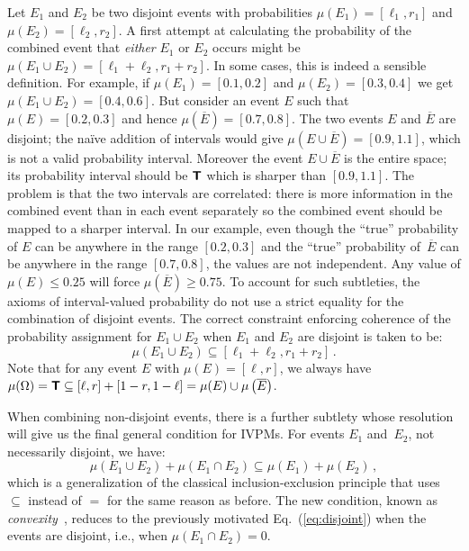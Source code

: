 \documentclass[english,reprint, aps, prl,superscriptaddress, showpacs,
showkeys, longbibliography, amsmath, amssymb, floatfix]{revtex4-1}
\theoremstyle{plain}
\theoremstyle{definition}
\newcommand{\interval}[1]{{\normalfont\textsf{\textbf{#1}}}}
\newcommand{\necess}{\interval{T}}
\begin{document}
Let $E_1$ and $E_2$ be two disjoint events with probabilities
$\mu(E_1)=[\ell_1,r_1]$ and $\mu(E_2)=[\ell_2,r_2]$. A first attempt
at calculating the probability of the combined event that
\emph{either} $E_1$ or $E_2$ occurs might be
$\mu(E_1\cup E_2) = [\ell_1+\ell_2,r_1+r_2]$. In some cases, this is
indeed a sensible definition. For example, if $\mu(E_1)=[0.1,0.2]$ and
$\mu(E_2)=[0.3,0.4]$ we get $\mu(E_1\cup E_2) = [0.4,0.6]$. But
consider an event $E$ such that $\mu(E)=[0.2,0.3]$ and hence
$\mu\left(\overline{E}\right)=[0.7,0.8]$. The two events $E$ and $\overline{E}$
are disjoint; the naïve addition of intervals would give
$\mu\left(E\cup\overline{E}\right)=[0.9,1.1]$, which is not a valid probability
interval. Moreover the event $E\cup\overline{E}$ is the
entire space; its probability interval should be
$\necess$ which is sharper than $[0.9,1.1]$. The problem is that the
two intervals are correlated: there is more information in the
combined event than in each event separately so the combined event should be mapped to
a sharper interval. In our example, even
though the ``true'' probability of $E$ can be anywhere in the range
$[0.2,0.3]$ and the ``true'' probability of~$\overline{E}$ can be
anywhere in the range $[0.7,0.8]$, the values are not independent. Any
value of $\mu(E) \leq 0.25$ will force $\mu\left(\overline{E}\right)\geq
0.75$. To account for such subtleties, the axioms of interval-valued
probability do not use a strict equality for the combination of
disjoint events. The correct constraint enforcing coherence of
the probability assignment for
$E_1\cup E_2$ when $E_1$ and $E_2$ are disjoint is taken to be:
\begin{equation}
\label{eq:disjoint}
\mu(E_1\cup E_2) \subseteq [\ell_1+\ell_2,r_1+r_2]\,.
\end{equation}
Note that for any event $E$ with $\mu(E)=[\ell,r]$, we always have
$\mu(\Omega)=\necess\subseteq[\ell,r]+[1-r,1-\ell]=\mu(E)\cup\mu\left(\overline{E}\right)$.

When combining non-disjoint events, there is a further subtlety whose
resolution will give us the final general condition for IVPMs. For
events $E_1$ and~$E_2$, not necessarily disjoint, we have:
\begin{equation}
\mu(E_1\cup E_2) + \mu(E_1\cap E_2) \subseteq \mu(E_1) + \mu(E_2)\,,
\label{eq:classicalconvex}
\end{equation}
which is a generalization of the classical inclusion-exclusion
principle that uses $\subseteq$ instead of $=$ for the same reason as
before. The new condition, known as
\emph{convexity}~\cite{Shapley1971,GilboaSchmeidler1994,NgMoYeh1997,Marinacci1999,MarinacciMontrucchio2005,Grabisch2016},
reduces to the previously motivated Eq.~(\ref{eq:disjoint}) when the
events are disjoint, i.e., when $\mu(E_1\cap E_2) = 0$.
\end{document}
